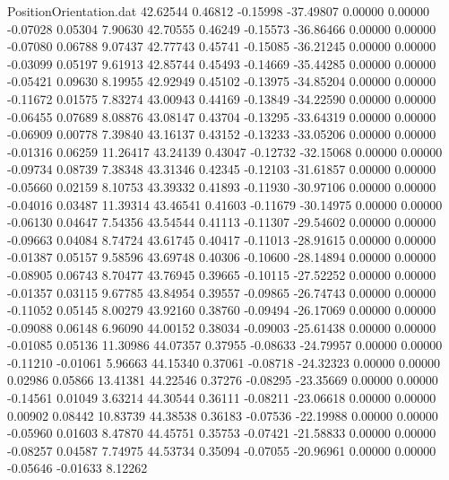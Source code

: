 \begin{filecontents}{PositionOrientation.dat}
  42.62544    0.46812   -0.15998   -37.49807    0.00000    0.00000   -0.07028    0.05304    7.90630
  42.70555    0.46249   -0.15573   -36.86466    0.00000    0.00000   -0.07080    0.06788    9.07437
  42.77743    0.45741   -0.15085   -36.21245    0.00000    0.00000   -0.03099    0.05197    9.61913
  42.85744    0.45493   -0.14669   -35.44285    0.00000    0.00000   -0.05421    0.09630    8.19955
  42.92949    0.45102   -0.13975   -34.85204    0.00000    0.00000   -0.11672    0.01575    7.83274
  43.00943    0.44169   -0.13849   -34.22590    0.00000    0.00000   -0.06455    0.07689    8.08876
  43.08147    0.43704   -0.13295   -33.64319    0.00000    0.00000   -0.06909    0.00778    7.39840
  43.16137    0.43152   -0.13233   -33.05206    0.00000    0.00000   -0.01316    0.06259   11.26417
  43.24139    0.43047   -0.12732   -32.15068    0.00000    0.00000   -0.09734    0.08739    7.38348
  43.31346    0.42345   -0.12103   -31.61857    0.00000    0.00000   -0.05660    0.02159    8.10753
  43.39332    0.41893   -0.11930   -30.97106    0.00000    0.00000   -0.04016    0.03487   11.39314
  43.46541    0.41603   -0.11679   -30.14975    0.00000    0.00000   -0.06130    0.04647    7.54356
  43.54544    0.41113   -0.11307   -29.54602    0.00000    0.00000   -0.09663    0.04084    8.74724
  43.61745    0.40417   -0.11013   -28.91615    0.00000    0.00000   -0.01387    0.05157    9.58596
  43.69748    0.40306   -0.10600   -28.14894    0.00000    0.00000   -0.08905    0.06743    8.70477
  43.76945    0.39665   -0.10115   -27.52252    0.00000    0.00000   -0.01357    0.03115    9.67785
  43.84954    0.39557   -0.09865   -26.74743    0.00000    0.00000   -0.11052    0.05145    8.00279
  43.92160    0.38760   -0.09494   -26.17069    0.00000    0.00000   -0.09088    0.06148    6.96090
  44.00152    0.38034   -0.09003   -25.61438    0.00000    0.00000   -0.01085    0.05136   11.30986
  44.07357    0.37955   -0.08633   -24.79957    0.00000    0.00000   -0.11210   -0.01061    5.96663
  44.15340    0.37061   -0.08718   -24.32323    0.00000    0.00000    0.02986    0.05866   13.41381
  44.22546    0.37276   -0.08295   -23.35669    0.00000    0.00000   -0.14561    0.01049    3.63214
  44.30544    0.36111   -0.08211   -23.06618    0.00000    0.00000    0.00902    0.08442   10.83739
  44.38538    0.36183   -0.07536   -22.19988    0.00000    0.00000   -0.05960    0.01603    8.47870
  44.45751    0.35753   -0.07421   -21.58833    0.00000    0.00000   -0.08257    0.04587    7.74975
  44.53734    0.35094   -0.07055   -20.96961    0.00000    0.00000   -0.05646   -0.01633    8.12262

\end{filecontents}
